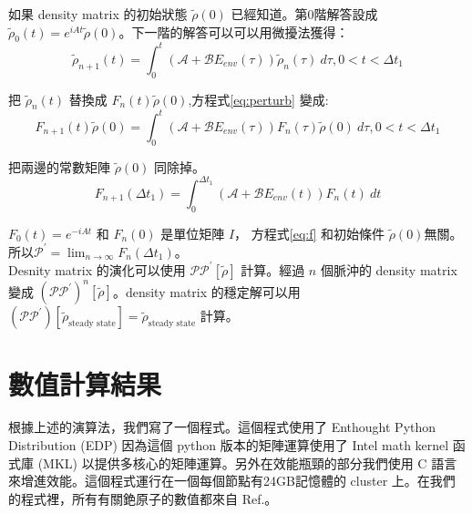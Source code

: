 \documentclass[11pt,a4paper]{article}
\begin{document}
如果 density matrix 的初始狀態 $\tilde{\rho}(0)$ 已經知道。第0階解答設成 $\tilde{\rho}_{0} (t) = e^{i A t} \tilde{\rho}(0)$。下一階的解答可以可以用微擾法獲得：\\

\begin{equation}
\label{eq:perturb}
\tilde{\rho}_{n+1}(t) = \int_0^{t} \left( \mathcal{A}+\mathcal{B} E_{env}(\tau) \right) \tilde{\rho}_n(\tau)\:d\tau, 0<t<\Delta t_1
\end{equation}

把 $\tilde{\rho}_n(t)$ 替換成 $F_n(t)\tilde{\rho}(0)$,方程式\ref{eq:perturb} 變成:\\

\begin{equation}
F_{n+1}(t)\tilde{\rho}(0) = \int_0^{t} \left( \mathcal{A}+\mathcal{B} E_{env}(\tau) \right) F_n(\tau)\tilde{\rho}(0)\:d\tau, 0<t<\Delta t_1
\end{equation}

把兩邊的常數矩陣 $\tilde{\rho}(0)$ 同除掉。\\

\begin{equation}
\label{eq:f}
F_{n+1}(\Delta t_1) = \int_0^{\Delta t_1} \left( \mathcal{A}+\mathcal{B} E_{env}(t) \right) F_n(t)\:dt
\end{equation}

$F_0(t) = e^{-iAt}$ 和 $F_{n}(0)$ 是單位矩陣 $I$， 方程式\ref{eq:f} 和初始條件 $\tilde{\rho}(0)$無關。所以$\mathcal{P}^\prime = \lim_{n\rightarrow \infty}F_{n}(\Delta t_{1})$。\\

Desnity matrix 的演化可以使用 $\mathcal{P}\mathcal{P}^\prime \left[ \tilde{\rho} \right]$ 計算。經過 $n$ 個脈沖的 density matrix 變成 $\left(\mathcal{P} \mathcal{P}^{\prime} \right)^{n} \left[ \tilde{\rho} \right]$。density matrix 的穩定解可以用 $\left(\mathcal{P} \mathcal{P}^{\prime} \right)\left[ \tilde{\rho}_{\mbox{steady state}} \right] = \tilde{\rho}_{\mbox{steady state}}$ 計算。\\

\section{數值計算結果}
根據上述的演算法，我們寫了一個程式。這個程式使用了 Enthought Python Distribution (EDP) 因為這個 python 版本的矩陣運算使用了 Intel math kernel 函式庫 (MKL) 以提供多核心的矩陣運算。另外在效能瓶頸的部分我們使用 C 語言來增進效能。這個程式運行在一個每個節點有24GB記憶體的 cluster 上。在我們的程式裡，所有有關銫原子的數值都來自 Ref.\cite{Steck2003}。\\
\end{document}
